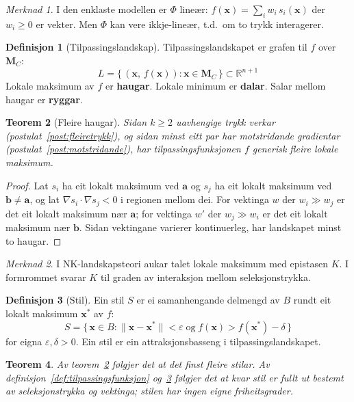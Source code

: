 \documentclass[11pt, a4paper]{article}
\theoremstyle{definition}
\newtheorem{defn}{Definisjon}[section]
\theoremstyle{plain}
\newtheorem{teorem}[defn]{Teorem}
\theoremstyle{remark}
\newtheorem*{merknad}{Merknad}
\newcommand{\MC}{\mathbf{M}_C}
\newcommand{\x}{\mathbf{x}}
\newcommand{\Reals}{\mathbb{R}}
\begin{document}
\begin{merknad}
I den enklaste modellen er $\Phi$ line\ae r: $f(\x) = \sum_i w_i\, s_i(\x)$ der
$w_i \ge 0$ er vekter. Men $\Phi$ kan vere ikkje-line\ae r, t.d.\ om to trykk interagerer.
\end{merknad}

\begin{defn}[Tilpassingslandskap]
\label{def:landskap}
Tilpassingslandskapet er grafen til $f$ over $\MC$:
\[
  L = \bigl\{\,(\x,\, f(\x)) : \x \in \MC\,\bigr\} \subset \Reals^{n+1}
\]
Lokale maksimum av $f$ er \textbf{haugar}. Lokale minimum er \textbf{dalar}.
Salar mellom haugar er \textbf{ryggar}.
\end{defn}

\begin{teorem}[Fleire haugar]
\label{teo:fleirehaugar}
Sidan $k \ge 2$ uavhengige trykk verkar (postulat~\ref{post:fleiretrykk}), og sidan
minst eitt par har motstridande gradientar (postulat~\ref{post:motstridande}),
har tilpassingsfunksjonen $f$ generisk fleire lokale maksimum.
\end{teorem}

\begin{proof}
Lat $s_i$ ha eit lokalt maksimum ved $\mathbf{a}$ og $s_j$ ha eit lokalt maksimum
ved $\mathbf{b} \neq \mathbf{a}$, og lat $\nabla s_i \cdot \nabla s_j < 0$ i regionen
mellom dei. For vektinga $w$ der $w_i \gg w_j$ er det eit lokalt maksimum n\ae r
$\mathbf{a}$; for vektinga $w'$ der $w_j \gg w_i$ er det eit lokalt maksimum n\ae r
$\mathbf{b}$. Sidan vektingane varierer kontinuerleg, har landskapet minst to haugar.
\end{proof}

\begin{merknad}
I NK-landskapsteori \citep{kauffman1993} aukar talet lokale maksimum med epistasen $K$.
I formrommet svarar $K$ til graden av interaksjon mellom seleksjonstrykka.
\end{merknad}

\begin{defn}[Stil]
\label{def:stil}
Ein stil $S$ er ei samanhengande delmengd av $B$ rundt eit lokalt maksimum $\x^*$ av $f$:
\[
  S = \bigl\{\,\x \in B : \|\x - \x^*\| < \varepsilon
  \;\text{og}\; f(\x) > f(\x^*) - \delta\,\bigr\}
\]
for eigna $\varepsilon, \delta > 0$.
Ein stil er ein attraksjonsbasseng i tilpassingslandskapet.
\end{defn}

\begin{teorem}
\label{teo:stilar}
Av teorem~\ref{teo:fleirehaugar} f\o lgjer det at det finst fleire stilar.
Av definisjon~\ref{def:tilpassingsfunksjon} og~\ref{def:stil} f\o lgjer det at kvar stil
er fullt ut bestemt av seleksjonstrykka og vektinga; stilen har ingen eigne friheitsgrader.
\end{teorem}
\end{document}
